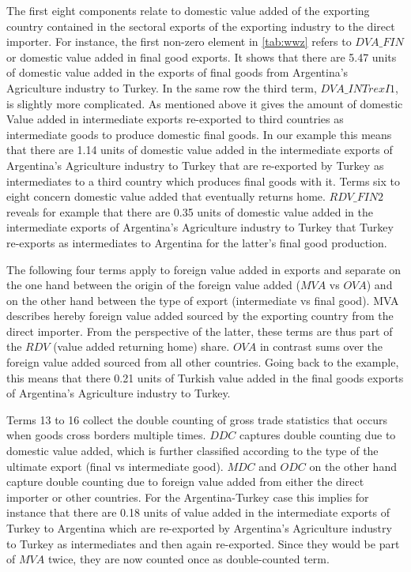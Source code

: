 \documentclass[a4paper]{article}\usepackage[]{graphicx}\usepackage[]{color}
\begin{document}
The first eight components relate to domestic value added of the exporting country contained in the sectoral exports of the exporting industry to the direct importer. For instance, the first non-zero element in \cref{tab:wwz} refers to $DVA\_FIN$ or domestic value added in final good exports. It shows that there are 5.47 units of domestic value added in the exports of final goods from Argentina's Agriculture industry to Turkey. In the same row the third term,  $DVA\_INTrexI1$, is slightly more complicated. As mentioned above it gives the amount of domestic Value added in intermediate exports re-exported to third countries as intermediate goods to produce domestic final goods. In our example this means that there are 1.14 units of domestic value added in the intermediate exports of Argentina's Agriculture industry to Turkey that are re-exported by Turkey as intermediates to a third country which produces final goods with it. Terms six to eight concern domestic value added that eventually returns home. $RDV\_FIN2$ reveals for example that there are 0.35 units of domestic value added in the intermediate exports of Argentina's Agriculture industry to Turkey that Turkey re-exports as intermediates to Argentina for the latter's final good production.

The following four terms apply to foreign value added in exports and separate on the one hand between the origin of the foreign value added ($MVA$ vs $OVA$) and on the other hand between the type of export (intermediate vs final good). MVA describes hereby foreign value added sourced by the exporting country from the direct importer. From the perspective of the latter, these terms are thus part of the $RDV$ (value added returning home) share. $OVA$ in contrast sums over the foreign value added sourced from all other countries. Going back to the example, this means that there 0.21 units of Turkish value added in the final goods exports of Argentina's Agriculture industry to Turkey.

Terms 13 to 16 collect the double counting of gross trade statistics that occurs when goods cross borders multiple times. $DDC$ captures double counting due to domestic value added, which is further classified according to the type of the ultimate export (final vs intermediate good). $MDC$ and $ODC$ on the other hand capture double counting due to foreign value added from either the direct importer or other countries. For the Argentina-Turkey case this implies for instance that there are 0.18 units of value added in the intermediate exports of Turkey to Argentina which are re-exported by Argentina's Agriculture industry to Turkey as intermediates and then again re-exported. Since they would be part of $MVA$ twice, they are now counted once as double-counted term.
\end{document}

